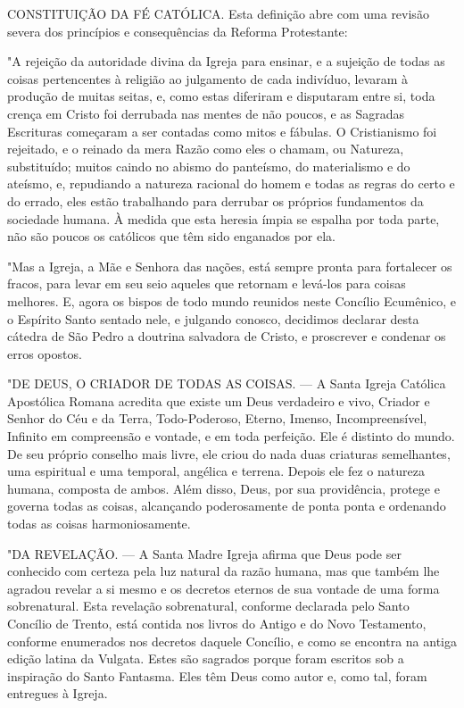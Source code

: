 \documentclass[11pt,a5paper,twoside,openany]{book}
\begin{document}
CONSTITUIÇÃO DA FÉ CATÓLICA. Esta definição abre com uma revisão severa dos princípios e consequências da Reforma Protestante:

"A rejeição da autoridade divina da Igreja para ensinar, e a sujeição de todas as coisas pertencentes à religião ao julgamento de cada indivíduo, levaram à produção de muitas seitas, e, como estas diferiram e disputaram entre si, toda crença em Cristo foi derrubada nas mentes de não poucos, e as Sagradas Escrituras começaram a ser contadas como mitos e fábulas. O Cristianismo foi rejeitado, e o reinado da mera Razão como eles o chamam, ou Natureza, substituído; muitos caindo no abismo do panteísmo, do materialismo e do ateísmo, e, repudiando a natureza racional do homem e todas as regras do certo e do errado, eles estão trabalhando para derrubar os próprios fundamentos da sociedade humana. À medida que esta heresia ímpia se espalha por toda parte, não são poucos os católicos que têm sido enganados por ela.

"Mas a Igreja, a Mãe e Senhora das nações, está sempre pronta para fortalecer os fracos, para levar em seu seio aqueles que retornam e levá-los para coisas melhores. E, agora os bispos de todo mundo reunidos neste Concílio Ecumênico, e o Espírito Santo sentado nele, e julgando conosco, decidimos declarar desta cátedra de São Pedro a doutrina salvadora de Cristo, e proscrever e condenar os erros opostos.

"DE DEUS, O CRIADOR DE TODAS AS COISAS. — A Santa Igreja Católica Apostólica Romana acredita que existe um Deus verdadeiro e vivo, Criador e Senhor do Céu e da Terra, Todo-Poderoso, Eterno, Imenso, Incompreensível, Infinito em compreensão e vontade, e em toda perfeição. Ele é distinto do mundo. De seu próprio conselho mais livre, ele criou do nada duas criaturas semelhantes, uma espiritual e uma temporal, angélica e terrena. Depois ele fez o natureza humana, composta de ambos. Além disso, Deus, por sua providência, protege e governa todas as coisas, alcançando poderosamente de ponta ponta e ordenando todas as coisas harmoniosamente.

"DA REVELAÇÃO. — A Santa Madre Igreja afirma que Deus pode ser conhecido com certeza pela luz natural da razão humana, mas que também lhe agradou revelar a si mesmo e os decretos eternos de sua vontade de uma forma sobrenatural. Esta revelação sobrenatural, conforme declarada pelo Santo Concílio de Trento, está contida nos livros do Antigo e do Novo Testamento, conforme enumerados nos decretos daquele Concílio, e como se encontra na antiga edição latina da Vulgata. Estes são sagrados porque foram escritos sob a inspiração do Santo Fantasma. Eles têm Deus como autor e, como tal, foram entregues à Igreja.
\end{document}
